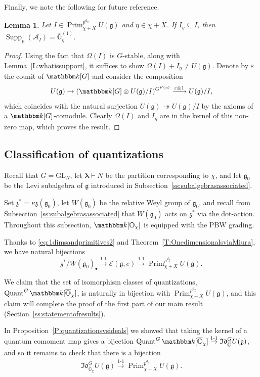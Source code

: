 \documentclass[twoside,12pt,reqno]{amsart}
\newtheorem{Lemma}[Theorem]{Lemma}
\theoremstyle{remark}
\numberwithin{equation}{section}
\def\k{{\mathbbm k}}
\def\Quant{\operatorname{Quant}}
\def\Prim{\operatorname{Prim}}
\def\Supp{\operatorname{Supp}}
\def\blambda{{\bm{\lambda}}}
\def\o{\overline}
\def\O{{\mathbb O}}
\def\cO{{\overline{\mathbb O}}}
\def\GL{\mathrm{GL}}
\def\g{{\mathfrak g}}
\def\z{\mathfrak{z}}
\def\Idl{\mathfrak{Id}}
\def\E{\mathcal{E}}
\newcommand{\A}{\mathcal{A}}
\begin{document}
Finally, we note the following for future reference.
\begin{Lemma}\label{L:suppAI}
    Let $I\in \Prim_{\chi+X}^{p^{d_\chi}} U(\g)$ and $\eta\in\chi+X$. If $I_\eta\subseteq I$, then $\Supp_p(\A_I)=\o{\O}_\eta^{(1)}$. 
\end{Lemma}
\begin{proof} Using the fact that $\Omega(I)$ is $G$-stable, along with Lemma~\ref{L:whatissupport}, it suffices to show $\Omega(I)+I_\eta\neq U(\g)$. Denote by $\varepsilon$ the counit of $\k[G]$ and consider the composition $$U(\g)\to (\k[G]\otimes U(\g)/I)^{G^{F(\eta)}}\xrightarrow{\varepsilon\otimes 1} U(\g)/I,$$ which coincides with the natural surjection $U(\g)\twoheadrightarrow U(\g)/I$ by the axioms of a $\k[G]$-comodule. Clearly $\Omega(I)$ and $I_\eta$ are in the kernel of this non-zero map, which proves the result.
\end{proof}


\subsection{Classification of quantizations}\label{ss:classquants}


Recall that $G=\GL_N$, let $\blambda\vdash N$ be the partition corresponding to $\chi$, and let $\g_0$ be the Levi subalgebra of $\g$ introduced in Subsection~\ref{ss:subalgebrasassociated}.

Set $\z^*=\kappa\z(\g_0)$, let $W(\g_0)$ be the relative Weyl group of $\g_0$, and recall from Subsection~\ref{ss:subalgebrasassociated} that $W(\g_0)$ acts on $\z^*$ via the dot-action. Throughout this subsection, $\k[\O_\chi]$ is equipped with the PBW grading.

Thanks to \eqref{eq:1dimsandprimitives2} and Theorem~\ref{T:OnedimensionalsviaMiura}, we have natural bijections
$$\z^*/W(\g_0)_\bullet \overset{1\text{-}1}{\to} \E(\g,e) \overset{1\text{-}1}{\to} \Prim_{\chi+X}^{p^{d_\chi}} U(\g).$$

We claim that the set of isomorphism classes of quantizations, $\Quant^G \k[\cO_\chi]$, is naturally in bijection with $\Prim_{\chi + X}^{{p^{d_\chi}}} U(\g)$, and this claim will complete the proof of the first part of our main result (Section~\ref{ss:statementofresults}). 

In Proposition~\ref{P:quantizationsvsideals} we showed that taking the kernel of a quantum comoment map gives a bijection $\Quant^G \k[\o\O_\chi] \overset{1\text{-}1}{\to} \Idl_{\cO}^G U(\g)$, and so it remains to check that there is a bijection
\begin{eqnarray}
\label{eq:lastbigectiontodo}
    \Idl_{\cO_\chi}^G U(\g) \overset{1\text{-}1}{\to} \Prim_{\chi+X}^{p^{d_\chi}} U(\g).
\end{eqnarray}
\end{document}
